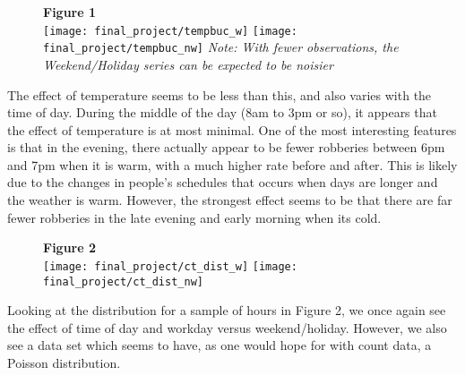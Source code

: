 \documentclass[11pt]{article}
\theoremstyle{definition}
\begin{document}
\begin{figure}[h]
    {\bf Figure 1} \\
    \texttt{[image: final\_project/tempbuc\_w]}
    \texttt{[image: final\_project/tempbuc\_nw]}
    \textit{Note: With fewer observations, the Weekend/Holiday series can be expected to be noisier}
\end{figure}
The effect of temperature seems to be less than this, and also varies with the time of day. During the middle of the day (8am to 3pm or so), it appears that the effect of temperature is at most minimal. One of the most interesting features is that in the evening, there actually appear to be fewer robberies between 6pm and 7pm when it is warm, with a much higher rate before and after. This is likely due to the changes in people's schedules that occurs when days are longer and the weather is warm. However, the strongest effect seems to be that there are far fewer robberies in the late evening and early morning when its cold. \par
\begin{figure}[h]
    {\bf Figure 2} \\
    \texttt{[image: final\_project/ct\_dist\_w]}
    \texttt{[image: final\_project/ct\_dist\_nw]}
\end{figure}
Looking at the distribution for a sample of hours in Figure 2, we once again see the effect of time of day and workday versus weekend/holiday. However, we also see a data set which seems to have, as one would hope for with count data, a Poisson distribution.
\end{document}
